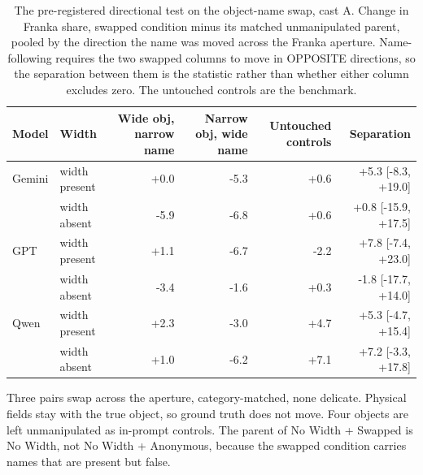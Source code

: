 \begin{table}[H]
  \centering
  \caption{The pre-registered directional test on the object-name swap, cast A. Change in Franka share, swapped condition minus its matched unmanipulated parent, pooled by the direction the name was moved across the Franka aperture. Name-following requires the two swapped columns to move in OPPOSITE directions, so the separation between them is the statistic rather than whether either column excludes zero. The untouched controls are the benchmark.}
  \label{tab:ex1:swap}
  \small
  \begin{tabular}{llrrrr}
    \toprule
    Model & Width & Wide obj, narrow name & Narrow obj, wide name & Untouched controls & Separation \\
    \midrule
    Gemini & width present & +0.0 & -5.3 & +0.6 & +5.3 [-8.3, +19.0] \\
     & width absent & -5.9 & -6.8 & +0.6 & +0.8 [-15.9, +17.5] \\
    GPT & width present & +1.1 & -6.7 & -2.2 & +7.8 [-7.4, +23.0] \\
     & width absent & -3.4 & -1.6 & +0.3 & -1.8 [-17.7, +14.0] \\
    Qwen & width present & +2.3 & -3.0 & +4.7 & +5.3 [-4.7, +15.4] \\
     & width absent & +1.0 & -6.2 & +7.1 & +7.2 [-3.3, +17.8] \\
    \bottomrule
  \end{tabular}
  \begin{minipage}{\linewidth}\vspace{2pt}\footnotesize Three pairs swap across the aperture, category-matched, none delicate. Physical fields stay with the true object, so ground truth does not move. Four objects are left unmanipulated as in-prompt controls. The parent of No Width + Swapped is No Width, not No Width + Anonymous, because the swapped condition carries names that are present but false.\end{minipage}
\end{table}
